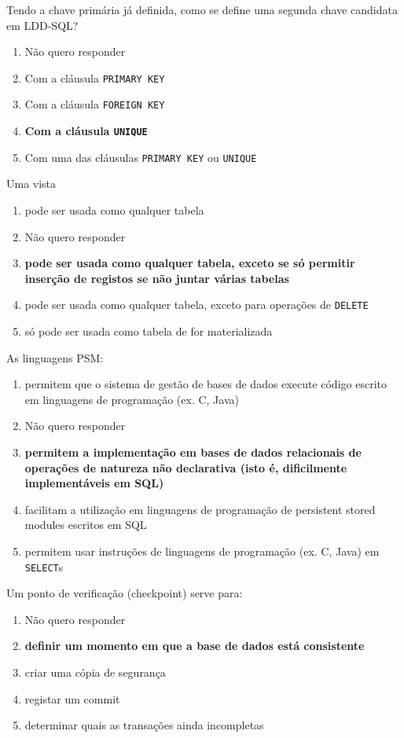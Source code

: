 \documentclass[type=normal, year=2015/16]{bdad_exam}
\begin{document}
{
Tendo a chave primária já definida, como se define uma segunda chave candidata em LDD-SQL?
\begin{enumerate}[label=\alph*.]\itemsep0em
    \item Não quero responder
    \item Com a cláusula \texttt{PRIMARY KEY}
    \item Com a cláusula \texttt{FOREIGN KEY}
    \item \textbf{Com a cláusula \texttt{UNIQUE} \greencheckmark}
    \item Com uma das cláusulas \texttt{PRIMARY KEY} ou \texttt{UNIQUE}
\end{enumerate}

Uma vista
\begin{enumerate}[label=\alph*.]\itemsep0em
    \item pode ser usada como qualquer tabela
    \item Não quero responder
    \item \textbf{pode ser usada como qualquer tabela, exceto se só permitir inserção de registos se não juntar várias tabelas \greencheckmark}
    \item pode ser usada como qualquer tabela, exceto para operações de \texttt{DELETE}
    \item só pode ser usada como tabela de for materializada
\end{enumerate}

As linguagens PSM:
\begin{enumerate}[label=\alph*.]\itemsep0em
    \item permitem que o sistema de gestão de bases de dados execute código escrito em linguagens de programação (ex. C, Java)
    \item Não quero responder
    \item \textbf{permitem a implementação em bases de dados relacionais de operações de natureza não declarativa (isto é, dificilmente implementáveis em SQL) \greencheckmark}
    \item facilitam a utilização em linguagens de programação de persistent stored modules escritos em SQL
    \item permitem usar instruções de linguagens de programação (ex. C, Java) em \texttt{SELECT}s
\end{enumerate}

Um ponto de verificação (checkpoint) serve para:
\begin{enumerate}[label=\alph*.]\itemsep0em
    \item Não quero responder
    \item \textbf{definir um momento em que a base de dados está consistente \greencheckmark}
    \item criar uma cópia de segurança
    \item registar um commit
    \item determinar quais as transações ainda incompletas
\end{enumerate}

}
\end{document}

